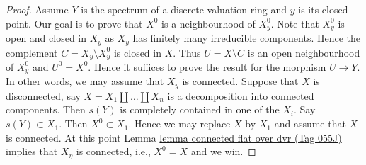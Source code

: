 \documentclass{amsart}
\theoremstyle{plain}
\theoremstyle{definition}
\theoremstyle{remark}
\numberwithin{equation}{subsection}
\begin{document}
\begin{proof}
\medskip\noindent
Assume $Y$ is the spectrum of a discrete valuation ring and $y$ is its closed
point. Our goal is to prove that $X^0$ is a neighbourhood of $X^0_y$.
Note that $X^0_y$ is open and closed in $X_y$ as $X_y$ has finitely
many irreducible components. Hence the complement $C = X_y \setminus X_y^0$
is closed in $X$. Thus $U = X \setminus C$ is an open neighbourhood of
$X^0_y$ and $U^0 = X^0$. Hence it suffices to prove the result for the
morphism $U \to Y$. In other words, we may assume that
$X_y$ is connected. Suppose that $X$ is disconnected, say
$X = X_1 \amalg \ldots \amalg X_n$ is a decomposition into connected
components. Then $s(Y)$ is completely contained in one of the $X_i$.
Say $s(Y) \subset X_1$. Then $X^0 \subset X_1$. Hence we may replace
$X$ by $X_1$ and assume that $X$ is connected. At this point
Lemma \href{https://stacks.math.columbia.edu/tag/055J}{lemma connected flat over dvr (Tag 055J)}
implies that $X_\eta$ is connected, i.e., $X^0 = X$ and we win.
\end{proof}
\end{document}
